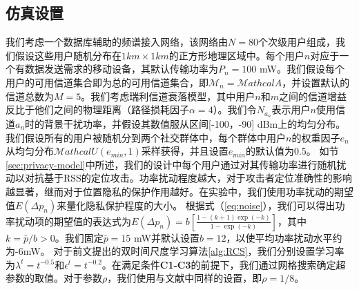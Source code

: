 \subsection{仿真设置}
我们考虑一个数据库辅助的频谱接入网络，该网络由$N=80$个次级用户组成，我们假设这些用户随机分布在$1km \times 1km$的正方形地理区域中。每个用户$n$对应于一个有数据发送需求的移动设备，其默认传输功率为$P_n=100$ mW\cite{FCCApril52012}。我们假设每个用户的可用信道集合即为总的可用信道集合，即$\mathcal{M}_n=\mathcal{M}athcal{A}$，并设置默认的信道总数为$M=5$。我们考虑瑞利信道衰落模型，其中用户$n$和$m$之间的信道增益反比于他们之间的物理距离（路径损耗因子$\alpha = 4$）。我们令$N_{a_n}$表示用户$n$使用信道$a_n$时的背景干扰功率，并假设其数值服从区间[-100，-90] dBm上的均匀分布。我们假设所有的用户被随机分到两个社交群体中，每个群体中用户$n$的权重因子$e_{n}$从均匀分布$\mathcal{M}athcal{U}(e_{min},1)$采样获得，并且设置$e_{min}$的默认值为0.5。
如节\ref{sec:privacy-model}中所述，我们的设计中每个用户通过对其传输功率进行随机扰动以对抗基于RSS的定位攻击。功率扰动程度越大，对于攻击者定位准确性的影响越显著，继而对于位置隐私的保护作用越好。在实验中，我们使用功率扰动的期望值$E(\Delta p_n)$来量化隐私保护程度的大小。
根据式（\ref{eq:noise}），我们可以得出功率扰动项的期望值的表达式为$E(\Delta p_n)=b\left[\frac{1-(k+1)\exp(-k)}{1-\exp(-k)}\right]$，其中$k=\bar{p}/b>0$。我们固定$\bar{p}=15$ mW并默认设置$b=12$，以使平均功率扰动水平约为-6mW。
对于前文提出的双时间尺度学习算法\ref{alg:RCS}，我们分别设置学习率为$\lambda^t=t^{-0.5}$和$\epsilon^t=t^{-0.2}$。在满足条件\textbf{C1-C3}的前提下，我们通过网格搜索确定超参数的取值。对于参数$\rho$，我们使用与文献\cite{Hart_areinforcement}中同样的设置，即$\rho=1/8$。
